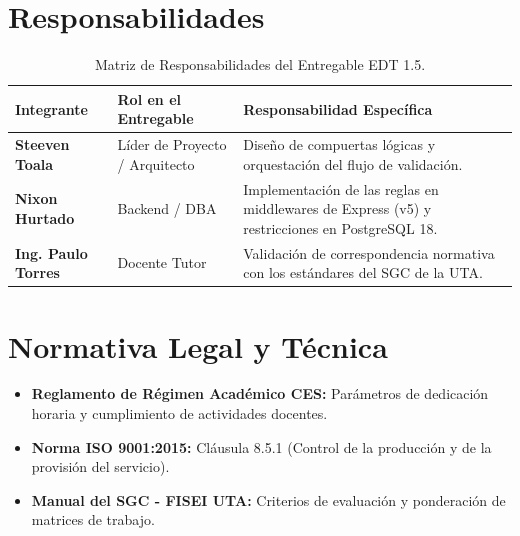 \documentclass[12pt,a4paper]{article}
\begin{document}
\section{Responsabilidades}
\begin{table}[htbp]
\centering
\small
\begin{tabularx}{\textwidth}{|>{\hsize=0.6\hsize\bfseries}X|>{\hsize=0.9\hsize}X|>{\hsize=1.5\hsize}X|}
    \hline
    \rowcolor{tableheader}
    Integrante & Rol en el Entregable & Responsabilidad Específica \\
    \hline
    Steeven Toala & Líder de Proyecto / Arquitecto & Diseño de compuertas lógicas y orquestación del flujo de validación. \\
    \hline
    Nixon Hurtado & Backend / DBA & Implementación de las reglas en middlewares de Express (v5) y restricciones en PostgreSQL 18. \\
    \hline
    Ing. Paulo Torres & Docente Tutor & Validación de correspondencia normativa con los estándares del SGC de la UTA. \\
    \hline
\end{tabularx}
\caption{Matriz de Responsabilidades del Entregable EDT 1.5.}
\end{table}

\section{Normativa Legal y Técnica}
\begin{itemize}[leftmargin=1.5em, itemsep=2pt]
    \item \textbf{Reglamento de Régimen Académico CES:} Parámetros de dedicación horaria y cumplimiento de actividades docentes.
    \item \textbf{Norma ISO 9001:2015:} Cláusula 8.5.1 (Control de la producción y de la provisión del servicio).
    \item \textbf{Manual del SGC - FISEI UTA:} Criterios de evaluación y ponderación de matrices de trabajo.
\end{itemize}
\end{document}
